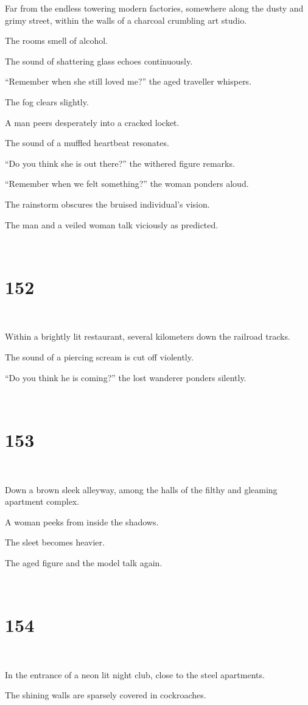 \documentclass{report}
\begin{document}
Far from the endless towering modern factories, somewhere along the dusty and grimy street, within the walls of a charcoal crumbling art studio.

The rooms smell of alcohol.

The sound of shattering glass echoes continuously.

``Remember when she still loved me?'' the aged traveller whispers.

The fog clears slightly.

A man peers desperately into a cracked locket.

The sound of a muffled heartbeat resonates.

``Do you think she is out there?'' the withered figure remarks.

``Remember when we felt something?'' the woman ponders aloud.

The rainstorm obscures the bruised individual's vision.

The man and a veiled woman talk viciously as predicted.

~
\chapter*{152}
~

Within a brightly lit restaurant, several kilometers down the railroad tracks.

The sound of a piercing scream is cut off violently.

``Do you think he is coming?'' the lost wanderer ponders silently.

~
\chapter*{153}
~

Down a brown sleek alleyway, among the halls of the filthy and gleaming apartment complex.

A woman peeks from inside the shadows.

The sleet becomes heavier.

The aged figure and the model talk again.

~
\chapter*{154}
~

In the entrance of a neon lit night club, close to the steel apartments.

The shining walls are sparsely covered in cockroaches.
\end{document}

